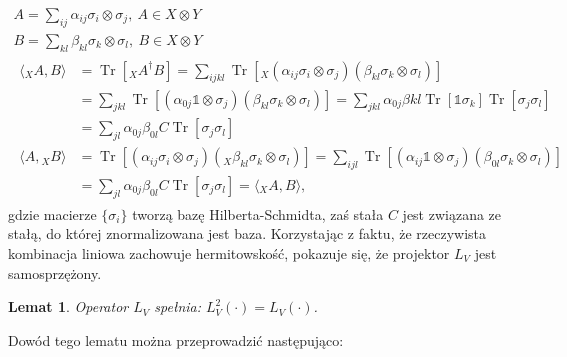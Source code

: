 \documentclass[10pt]{article} %
\newtheorem{lm}{Lemat}
\DeclareMathOperator{\Trs}{Tr}
\newcommand{\I}{\mathbb{1}}
\begin{document}
\begin{gather}
A =\sum_{ij} \alpha_{ij} \sigma_i \otimes \sigma_j ,~A \in X \otimes Y \\
B =\sum_{kl} \beta_{kl} \sigma_k \otimes \sigma_l,~B\in X\otimes Y\\
\begin{split}
\langle {}_X A, B \rangle &= \Trs \left[ {}_X A^\dag B\right] = \sum_{ijkl} \Trs\left[ {}_X (\alpha_{ij} \sigma_i \otimes \sigma_j) (\beta_{kl} \sigma_k \otimes \sigma_l)\right] \\
&= \sum_{jkl} \Trs \left[ (\alpha_{0j} \I \otimes \sigma_j) (\beta_{kl} \sigma_k \otimes \sigma_l) \right] = \sum_{jkl} \alpha_{0j} \beta{kl} \Trs \left[ \I \sigma_k\right] \Trs \left[ \sigma_j \sigma_l\right] \\
&= \sum_{jl} \alpha_{0j} \beta_{0l}C \Trs \left[ \sigma_j \sigma_l \right] \\
\langle A, {}_X B \rangle &=  \Trs\left[ (\alpha_{ij} \sigma_i \otimes \sigma_j) ( {}_X \beta_{kl} \sigma_k \otimes \sigma_l)\right] = \sum_{ijl} \Trs \left[ (\alpha_{ij} \I \otimes \sigma_j) (\beta_{0l} \sigma_k \otimes \sigma_l) \right] \\
&= \sum_{jl} \alpha_{0j} \beta_{0l}C \Trs \left[ \sigma_j \sigma_l \right] = \langle {}_X A, B \rangle,
\end{split}
\end{gather} gdzie macierze $\{ \sigma_i \}$ tworzą bazę Hilberta-Schmidta, zaś stała $C$ jest związana ze stałą, do której znormalizowana jest baza. Korzystając z faktu, że rzeczywista kombinacja liniowa zachowuje hermitowskość, pokazuje się, że projektor $L_V$ jest samosprzężony. 
\begin{lm}
Operator $L_V$ spełnia: $L_V^2(\cdot) = L_V(\cdot)$.
\end{lm}
Dowód tego lematu można przeprowadzić następująco:
\end{document}

